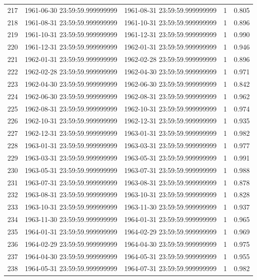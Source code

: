 \begin{table}
\begin{tabular}{lcccc}
217 & 1961-06-30 23:59:59.999999999 & 1961-08-31 23:59:59.999999999 & 1 & 0.805 \\
218 & 1961-08-31 23:59:59.999999999 & 1961-10-31 23:59:59.999999999 & 1 & 0.896 \\
219 & 1961-10-31 23:59:59.999999999 & 1961-12-31 23:59:59.999999999 & 1 & 0.990 \\
220 & 1961-12-31 23:59:59.999999999 & 1962-01-31 23:59:59.999999999 & 1 & 0.946 \\
221 & 1962-01-31 23:59:59.999999999 & 1962-02-28 23:59:59.999999999 & 1 & 0.896 \\
222 & 1962-02-28 23:59:59.999999999 & 1962-04-30 23:59:59.999999999 & 1 & 0.971 \\
223 & 1962-04-30 23:59:59.999999999 & 1962-06-30 23:59:59.999999999 & 1 & 0.842 \\
224 & 1962-06-30 23:59:59.999999999 & 1962-08-31 23:59:59.999999999 & 1 & 0.962 \\
225 & 1962-08-31 23:59:59.999999999 & 1962-10-31 23:59:59.999999999 & 1 & 0.974 \\
226 & 1962-10-31 23:59:59.999999999 & 1962-12-31 23:59:59.999999999 & 1 & 0.935 \\
227 & 1962-12-31 23:59:59.999999999 & 1963-01-31 23:59:59.999999999 & 1 & 0.982 \\
228 & 1963-01-31 23:59:59.999999999 & 1963-03-31 23:59:59.999999999 & 1 & 0.977 \\
229 & 1963-03-31 23:59:59.999999999 & 1963-05-31 23:59:59.999999999 & 1 & 0.991 \\
230 & 1963-05-31 23:59:59.999999999 & 1963-07-31 23:59:59.999999999 & 1 & 0.988 \\
231 & 1963-07-31 23:59:59.999999999 & 1963-08-31 23:59:59.999999999 & 1 & 0.878 \\
232 & 1963-08-31 23:59:59.999999999 & 1963-10-31 23:59:59.999999999 & 1 & 0.828 \\
233 & 1963-10-31 23:59:59.999999999 & 1963-11-30 23:59:59.999999999 & 1 & 0.937 \\
234 & 1963-11-30 23:59:59.999999999 & 1964-01-31 23:59:59.999999999 & 1 & 0.965 \\
235 & 1964-01-31 23:59:59.999999999 & 1964-02-29 23:59:59.999999999 & 1 & 0.969 \\
236 & 1964-02-29 23:59:59.999999999 & 1964-04-30 23:59:59.999999999 & 1 & 0.975 \\
237 & 1964-04-30 23:59:59.999999999 & 1964-05-31 23:59:59.999999999 & 1 & 0.955 \\
238 & 1964-05-31 23:59:59.999999999 & 1964-07-31 23:59:59.999999999 & 1 & 0.982 \\

\end{tabular}
\end{table}
